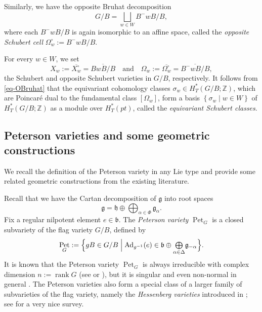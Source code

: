 \documentclass[11pt, letterpaper]{amsart}
\numberwithin{equation}{section}
\DeclareMathOperator{\Pet}{Pet}
\DeclareMathOperator{\rank}{rank}
\begin{document}
Similarly, we have the opposite Bruhat decomposition
\begin{equation} \label{eq-OBruhat}
G/B=\bigsqcup_{w\in W} B^-wB/B,
\end{equation}
where each \(B^-wB/B\) is again isomorphic to an affine space, called the \emph{opposite Schubert cell} \(\Omega^{\circ}_{w}:=B^-wB/B\).

For every \(w\in W\), we set
\[
X_{w}:=\overline{X^{\circ}_{w}}=\overline{BwB/B}
\quad\text{and}\quad
\Omega_{w}:=\overline{\Omega^{\circ}_{w}}=\overline{B^{-}wB/B},
\]
the Schubert and opposite Schubert varieties in \(G/B\), respectively. It follows from \eqref{eq-OBruhat} that the equivariant cohomology classes $\sigma_w \in H_T^*(G/B;\mathbb{Z})$, which are Poincaré dual to the fundamental class $\left[\Omega_{w}\right]$, form a basis $\left\{\sigma_w \mid w \in W\right\}$ of $H_T^*(G / B;\mathbb{Z})$ as a module over $H_T^*(pt)$, called the \emph{equivariant Schubert classes}. 


\subsection{Peterson varieties and some geometric constructions} \label{sec-pre-Peterson}
We recall the definition of the Peterson variety in any Lie type and provide some related geometric constructions from the existing literature.

Recall that we have the Cartan decomposition of $\mathfrak{g}$ into root spaces
$$\mathfrak{g}=\mathfrak{h}\oplus\bigoplus_{\alpha\in\Phi}\mathfrak{g}_{\alpha}.$$
Fix a regular nilpotent element $e\in\mathfrak{b}$.  The \emph{Peterson variety} $\Pet_{G}$ is a closed subvariety of the flag variety $G/B$, defined by
\begin{equation}\label{eq-def of Pet}
\Pet_{G}:=\Bigl\{gB\in G/B\;\Big|\;
\text{Ad}_{g^{-1}}(e)\in\mathfrak{b}\oplus
{\textstyle\bigoplus\limits_{\alpha\in\Delta}}\mathfrak{g}_{-\alpha}\Bigr\}.
\end{equation}
It is known that the Peterson variety $\Pet_{G}$ is always irreducible with complex dimension $n:=\rank G$ (see \cite{peterson1997quantum} or \cite[Proposition 6.2]{lam2016total}), but it is singular and even non-normal in general \cite{kostant1996flag}. The Peterson varieties also form a special class of a larger family of subvarieties of the flag variety, namely the \emph{Hessenberg varieties} introduced in \cite{de1992hessenberg}; see \cite{abe2017survey} for a very nice survey.
\end{document}
